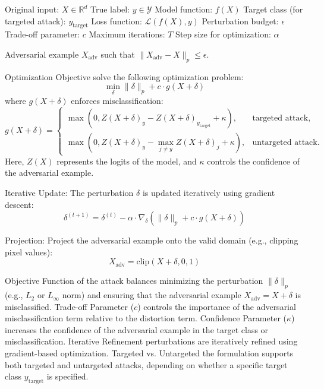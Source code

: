 Original input: $X \in \mathbb{R}^d$
True label: $y \in \mathcal{Y}$
Model function: $f(X)$
Target class (for targeted attack): $y_{\text{target}}$
Loss function: $\mathcal{L}(f(X), y)$
Perturbation budget: $\epsilon$
Trade-off parameter: $c$
Maximum iterations: $T$
Step size for optimization: $\alpha$


Adversarial example $X_{\text{adv}}$ such that $\|X_{\text{adv}} - X\|_p \leq \epsilon$.

Optimization Objective solve the following optimization problem:
    \[
    \min_{\delta} \|\delta\|_p + c \cdot g(X + \delta)
    \]
    where $g(X + \delta)$ enforces misclassification:
    \[
    g(X + \delta) = 
    \begin{cases} 
    \max(0, Z(X + \delta)_y - Z(X + \delta)_{y_{\text{target}}} + \kappa), & \text{targeted attack}, \\
    \max(0, Z(X + \delta)_y - \max_{j \neq y} Z(X + \delta)_j + \kappa), & \text{untargeted attack}.
    \end{cases}
    \]
    Here, $Z(X)$ represents the logits of the model, and $\kappa$ controls the confidence of the adversarial example.

Iterative Update: The perturbation $\delta$ is updated iteratively using gradient descent:
    \[
    \delta^{(t+1)} = \delta^{(t)} - \alpha \cdot \nabla_\delta \left( \|\delta\|_p + c \cdot g(X + \delta) \right)
    \]

Projection: Project the adversarial example onto the valid domain (e.g., clipping pixel values):
    \[
    X_{\text{adv}} = \text{clip}(X + \delta, 0, 1)
    \]

Objective Function of the attack balances minimizing the perturbation $\|\delta\|_p$ (e.g., $L_2$ or $L_\infty$ norm) and ensuring that the adversarial example $X_{\text{adv}} = X + \delta$ is misclassified. Trade-off Parameter ($c$) controls the importance of the adversarial misclassification term relative to the distortion term. Confidence Parameter ($\kappa$) increases the confidence of the adversarial example in the target class or misclassification. Iterative Refinement perturbations are iteratively refined using gradient-based optimization. Targeted vs. Untargeted the formulation supports both targeted and untargeted attacks, depending on whether a specific target class $y_{\text{target}}$ is specified.
